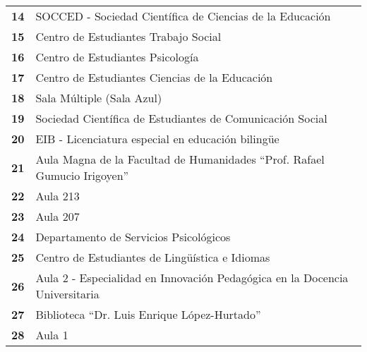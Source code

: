 \begin{longtable}{ c  X }
\addlinespace
\textbf{14}
&
SOCCED - Sociedad Científica de Ciencias de la Educación
\\

\addlinespace
\textbf{15}
&
Centro de Estudiantes Trabajo Social
\\



\addlinespace
\textbf{16}
&
Centro de Estudiantes Psicología
\\

\addlinespace
\textbf{17}
&
Centro de Estudiantes Ciencias de la Educación
\\

\addlinespace
\textbf{18}
&
Sala Múltiple (Sala Azul)
\\

      \addlinespace
      \textbf{19}
      &
        Sociedad Científica de Estudiantes de Comunicación Social
      \\

      \addlinespace
      \textbf{20}
      &
      EIB - Licenciatura especial en educación bilingüe
      \\

      \addlinespace
      \textbf{21}
      &
      Aula Magna de la Facultad de Humanidades ``Prof. Rafael Gumucio Irigoyen''
      \\

      \addlinespace
      \textbf{22}
      &
      Aula 213
      \\

      \addlinespace
      \textbf{23}
      &
      Aula 207
      \\

      \addlinespace
      \textbf{24}
      &
      Departamento de Servicios Psicológicos
      \\

      \addlinespace
      \textbf{25}
      &
      Centro de Estudiantes de Lingüística e Idiomas
      \\



      \addlinespace
      \textbf{26}
      &
      Aula 2 - Especialidad en Innovación Pedagógica en la Docencia Universitaria
      \\

      \addlinespace
      \textbf{27}
      &
      Biblioteca ``Dr. Luis Enrique López-Hurtado''
      \\

      \addlinespace
      \textbf{28}
      &
      Aula 1
      \\


\end{longtable}
